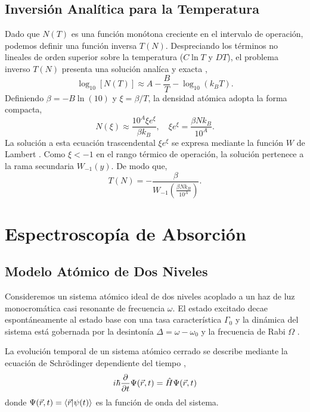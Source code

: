 \subsection{Inversión Analítica para la Temperatura}
Dado que $N(T)$ es una función monótona creciente en el intervalo de operación, podemos definir una función inversa $T(N)$. Despreciando los términos no lineales de orden superior sobre la temperatura ($C \ln T$ y $D T$), el problema inverso $T(N)$ presenta una solución analíca y exacta \cite{alcockVapourPressureEquations1984},
\begin{equation*}
    \log_{10} [N(T)] \approx A - \frac{B}{T} - \log_{10} (k_B T).
\end{equation*}
Definiendo $\beta = -B \ln(10)$ y $\xi = \beta / T$, la densidad atómica adopta la forma compacta,
\begin{equation*}
    N(\xi) \approx \frac{10^{A} \xi e^{\xi}}{\beta k_B}, \quad \xi e^{\xi} = \frac{\beta N k_B}{10^{A}}.
\end{equation*}
La solución a esta ecuación trascendental $\xi e^{\xi}$ se expresa mediante la función $W$ de Lambert \cite{corlessLambertWFunction1996}. Como $\xi < -1$ en el rango térmico de operación, la solución pertenece a la rama secundaria $W_{-1}(y)$. De modo que,
\begin{equation}
    \boxed{
    T(N) = - \frac{\beta}{W_{-1}\left(\frac{\beta N k_B}{10^{A}}\right)}.
    }
\end{equation}
\section{Espectroscopía de Absorción}
\subsection{Modelo Atómico de Dos Niveles}
Consideremos un sistema atómico ideal de dos niveles acoplado a un haz de luz monocromática casi resonante de frecuencia $\omega$. El estado excitado decae espontáneamente al estado base con una tasa característica $\Gamma_0$ y la dinámica del sistema está gobernada por la desintonía $\Delta = \omega - \omega_0$ y la frecuencia de Rabi $\Omega$ \cite{robertw.boydNonlinearOptics, allenOpticalResonanceTwolevel1975,demtroderLaserSpectroscopy1996}.

La evolución temporal de un sistema atómico cerrado se describe mediante la ecuación de Schrödinger dependiente del tiempo \cite{cohen-tannoudjiQuantumMechanics1977, griffithsIntroductionQuantumMechanics2017},
\begin{equation}
    i \hbar \pdv{}{t} \Psi(\vec{r}, t) = \hat{H} \Psi(\vec{r}, t)
\end{equation}
donde $ \Psi(\vec{r}, t) = \braket{\vec{r}}{\psi(t)}$ es la función de onda del sistema. 

